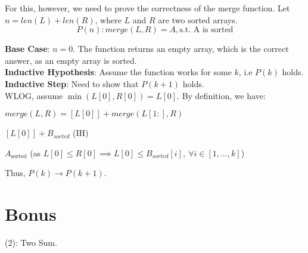 \documentclass[a4paper]{article}
\begin{document}
\begin{enumerate}
\begin{enumerate}[label=\roman*]
For this, however, we need to prove the correctness of the merge function. Let $n = len(L) + len(R)$, where $L$ and $R$ are two sorted arrays.\\
$$P(n): merge(L, R) = A, \text{s.t. A is sorted}$$

\textbf{Base Case}: $n = 0$. The function returns an empty array, which is the correct answer, as an empty array is sorted. \\

\textbf{Inductive Hypothesis}: Assume the function works for some $k$, i.e $P(k)$ holds.\\

\textbf{Inductive Step}: Need to show that $P(k+1)$ holds.\\

WLOG, assume $\min(L[0], R[0]) = L[0]$. By definition, we have:
\begin{sollist}
    \item $merge(L, R) = [L[0]] + merge(L[1:], R)$
    \item $[L[0]] + B_{sorted}$ (IH)
    \item $A_{\text{sorted}}$ (as $L[0] \leq R[0] \implies L[0] \leq B_{sorted}[i],\ \forall i \in [1, ..., k]$)
\end{sollist}

Thus, $P(k) \rightarrow P(k+1)$.\\
\end{enumerate}
\end{enumerate}

\section{Bonus}

(2): Two Sum.
\end{document}

